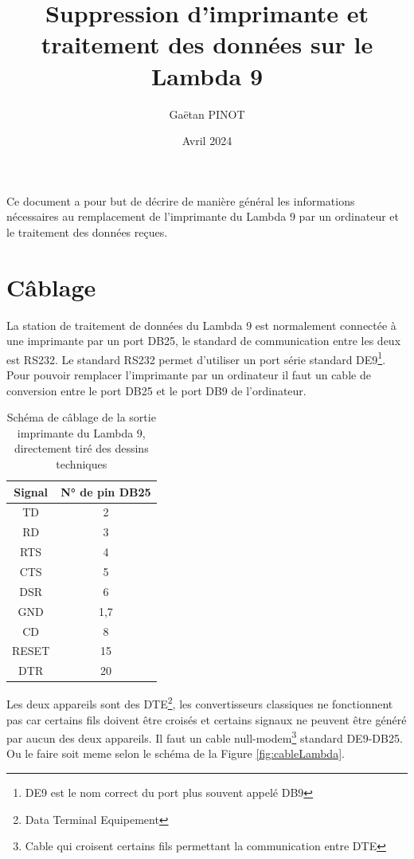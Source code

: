 \documentclass[a4paper, 12pt]{article}
\title{\Large\textbf{Suppression d'imprimante et traitement des données sur le Lambda 9}}
\author{Gaëtan PINOT}
\date{Avril 2024}
\begin{document}
\maketitle
Ce document a pour but de décrire de manière général les informations nécessaires au remplacement de l'imprimante du Lambda 9 par un ordinateur et le traitement des données reçues.

\newpage



\section{Câblage}\label{cablage}


La station de traitement de données du Lambda 9 est normalement connectée à une imprimante par un port DB25, le standard de communication entre les deux est RS232.
Le standard RS232 permet d'utiliser un port série standard DE9\footnote{DE9 est le nom correct du port plus souvent appelé DB9 %
}.
Pour pouvoir remplacer l'imprimante par un ordinateur il faut un cable de conversion entre le port DB25 et le port DB9 de l'ordinateur.


\begin{table}[htb]
	\begin{tabular}{|c|c|}
		\hline
		Signal & N° de pin DB25 \\ \hline
		TD     & 2              \\ \hline
		RD     & 3              \\ \hline
		RTS    & 4              \\ \hline
		CTS    & 5              \\ \hline
		DSR    & 6              \\ \hline
		GND    & 1,7            \\ \hline
		CD     & 8              \\ \hline
		RESET  & 15             \\ \hline
		DTR    & 20             \\ \hline
	\end{tabular}
	\centering
	\caption{Schéma de câblage de la sortie imprimante du Lambda 9, directement tiré des dessins techniques}
	\label{table:pinoutLambda}
\end{table}

Les deux appareils sont des DTE\footnote{Data Terminal Equipement}, les convertisseurs classiques ne fonctionnent pas car certains fils doivent être croisés et certains signaux ne peuvent être généré par aucun des deux appareils.
Il faut un cable null-modem\footnote{Cable qui croisent certains fils permettant la communication entre DTE} standard DE9-DB25.
Ou le faire soit meme selon le schéma de la Figure \ref{fig:cableLambda}.
\end{document}

